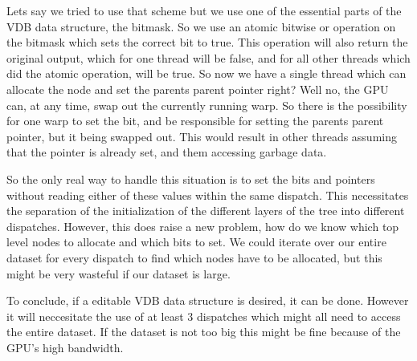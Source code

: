 Lets say we tried to use that scheme but we use one of the essential parts of the VDB data structure, the bitmask. So we use an atomic bitwise or operation on the bitmask which sets the correct bit to true. This operation will also return the original output, which for one thread will be false, and for all other threads which did the atomic operation, will be true. So now we have a single thread which can allocate the node and set the parents parent pointer right? Well no, the GPU can, at any time, swap out the currently running warp. So there is the possibility for one warp to set the bit, and be responsible for setting the parents parent pointer, but it being swapped out. This would result in other threads assuming that the pointer is already set, and them accessing garbage data.

So the only real way to handle this situation is to set the bits and pointers without reading either of these values within the same dispatch. This necessitates the separation of the initialization of the different layers of the tree into different dispatches. However, this does raise a new problem, how do we know which top level nodes to allocate and which bits to set. We could iterate over our entire dataset for every dispatch to find which nodes have to be allocated, but this might be very wasteful if our dataset is large.

To conclude, if a editable VDB data structure is desired, it can be done. However it will neccesitate the use of at least 3 dispatches which might all need to access the entire dataset. If the dataset is not too big this might be fine because of the GPU's high bandwidth.

